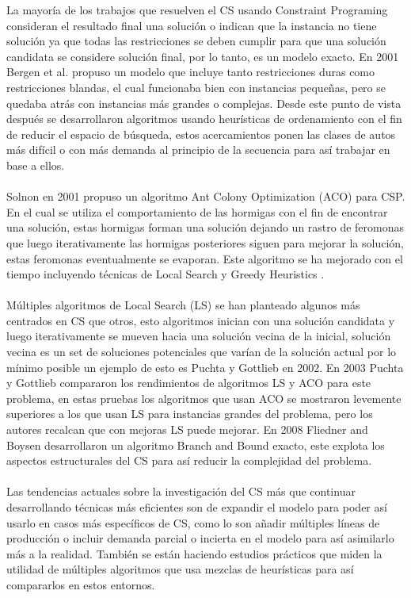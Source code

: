 \documentclass[letter, 10pt]{article}
\begin{document}
La mayor\'ia de los trabajos que resuelven el CS usando Constraint Programing consideran el resultado final una soluci\'on o indican que la instancia no tiene soluci\'on ya que todas las restricciones se deben cumplir para que una soluci\'on candidata se considere soluci\'on final, por lo tanto, es un modelo exacto. En 2001 Bergen et al. \cite{Bergen} propuso un modelo que incluye tanto restricciones duras como restricciones blandas, el cual funcionaba bien con instancias peque\~{n}as, pero
se quedaba atr\'as con instancias m\'as grandes o complejas. Desde este punto de vista despu\'es se desarrollaron algoritmos usando heur\'isticas de ordenamiento con el fin de reducir el espacio de b\'usqueda, estos acercamientos ponen las clases de autos m\'as dif\'icil o con m\'as demanda al principio de la secuencia para as\'i trabajar en base a ellos.\\\\
Solnon en 2001 \cite{Solnon01} propuso un algoritmo Ant Colony Optimization (ACO) para CSP. En el cual se utiliza el comportamiento de las hormigas con el fin de encontrar una soluci\'on, estas hormigas forman una soluci\'on dejando un rastro de feromonas que luego iterativamente las hormigas posteriores siguen para mejorar la soluci\'on, estas feromonas eventualmente se evaporan. Este algoritmo se ha mejorado con el tiempo incluyendo t\'ecnicas de Local Search y Greedy Heuristics \cite{Lin}.\\\\
M\'ultiples algoritmos de Local Search (LS) se han planteado algunos m\'as centrados en CS que otros, esto algoritmos inician con una soluci\'on candidata y luego iterativamente se mueven hacia una soluci\'on vecina de la inicial, soluci\'on vecina es un set de soluciones potenciales que var\'ian de la soluci\'on actual por lo m\'inimo posible un ejemplo de esto es Puchta y Gottlieb \cite{Puchta02} en 2002. En 2003 Puchta y Gottlieb \cite{Puchta03} compararon los rendimientos de algoritmos LS y ACO para este problema, en estas pruebas los algoritmos que usan ACO se mostraron levemente superiores a los que usan LS para instancias grandes del problema, pero los autores recalcan que con mejoras LS puede mejorar. En 2008 Fliedner and Boysen \cite{Fli} desarrollaron un algoritmo Branch and Bound exacto, este explota los aspectos estructurales del CS para as\'i reducir la complejidad del problema.
\\\\
Las tendencias actuales sobre la investigaci\'on del CS m\'as que continuar desarrollando t\'ecnicas m\'as eficientes son de expandir el modelo para poder as\'i usarlo en casos m\'as espec\'ificos de CS, como lo son a\~{n}adir m\'ultiples l\'ineas de producci\'on o incluir demanda parcial o incierta en el modelo para as\'i asimilarlo m\'as a la realidad. Tambi\'en se est\'an haciendo estudios pr\'acticos que miden la utilidad de m\'ultiples algoritmos que usa mezclas de heur\'isticas para as\'i compararlos en estos entornos. 
\end{document}
